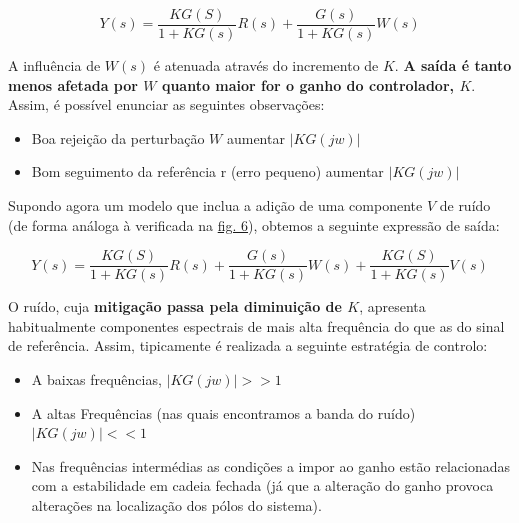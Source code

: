 $$
    Y(s) = \dfrac{KG(S)}{1 + KG(s)}R(s) + \boxed{\dfrac{G(s)}{1 + KG(s)}W(s)}
$$

\noindent A influência de $W(s)$ é atenuada através do incremento de $K$. \textbf{A saída é tanto menos afetada por $W$ quanto maior for o ganho do controlador, $K$}. Assim, é possível enunciar as seguintes observações:

\begin{itemize}
    \item Boa rejeição da perturbação $W$ aumentar $|KG(jw)|$
    \item Bom seguimento da referência r (erro pequeno) aumentar $|KG(jw)|$
\end{itemize}

\noindent Supondo agora um modelo que inclua a adição de uma componente $V$ de ruído (de forma análoga à verificada na \hyperref[fig:feed-loop]{fig. 6}), obtemos a seguinte expressão de saída:

$$
    Y(s) = \dfrac{KG(S)}{1 + KG(s)}R(s) + \boxed{\dfrac{G(s)}{1 + KG(s)}W(s) + \dfrac{KG(S)}{1 + KG(s)}V(s)}
$$

\noindent O ruído, cuja \textbf{mitigação passa pela diminuição de $K$}, apresenta habitualmente componentes espectrais de mais alta frequência do que as do sinal de referência. Assim, tipicamente é realizada a seguinte estratégia de controlo:

\begin{itemize}
    \item A baixas frequências, $|KG(jw)| >> 1$
    \item A altas Frequências (nas quais encontramos a banda do ruído) $|KG(jw)| <<1$
    \item Nas frequências intermédias as condições a impor ao ganho estão relacionadas com a
estabilidade em cadeia fechada (já que a alteração do ganho provoca alterações na localização dos pólos do sistema). 
\end{itemize}

